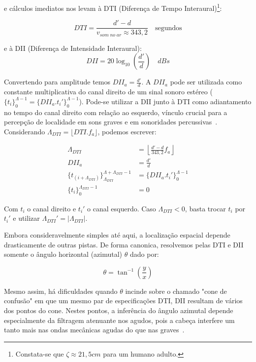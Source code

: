 e cálculos imediatos nos levam à DTI (Diferença de Tempo Interaural)\footnote{Constata-se que $\zeta \approx 21,5cm$ para um humano adulto.}:

\begin{equation}
DTI=\frac{d'-d}{v_{som\;no\;ar}\approx 343,2 }\quad \text{segundos}
\end{equation}

e à DII (Diferença de Intensidade Interaural):
\begin{equation}
DII=20\log_{10}\left (\frac{d'}{d}\right) \quad dBs
\end{equation}

Convertendo para amplitude temos $DII_a=\frac{d'}{d}$. A $DII_a$ pode
ser utilizada como constante multiplicativa do canal direito de um sinal sonoro estéreo ($\{t_i\}_0^{\Lambda -1}=\{DII_a . t_i'\}_0^{\Lambda -1}$). Pode-se utilizar a DII junto à DTI como adiantamento no tempo do canal direito com relação ao esquerdo, vínculo crucial para a percepção de localidade em sons graves e em sonoridades percussivas~\cite{Heeger}.
Considerando $\Lambda_{DTI}=\lfloor DTI . f_a \rfloor $, podemos escrever:

\begin{equation}
\begin{split}
\Lambda_{DTI} & = \left \lfloor \frac{d'-d}{343,2}  f_a \right \rfloor \\
DII_a & = \frac{d'}{d} \\
\{t_{(i+\Lambda_{DTI})}\}_{\Lambda_{DTI}}^{\Lambda+\Lambda_{DTI}-1} & =\{DII_a . t_i'\}_0^{\Lambda-1} \\
\{t_i\}_0^{\Lambda_{DTI}-1} & = 0
\end{split}
\end{equation}

Com $t_i$ o canal direito e $t_i'$ o canal esquerdo. Caso $\Lambda_{DTI} < 0 $, basta trocar $t_i$ por $t_i'$  e utilizar $\Lambda_{DTI}'= | \Lambda_{DTI} | $.

Embora consideravelmente simples até aqui, a localização espacial depende drasticamente de outras pistas. De forma canonica, resolvemos pelas
DTI e DII somente o ângulo horizontal (azimutal) $\theta$ dado por:

\begin{equation}
\theta=\tan^{-1}\left ( \frac{y}{ x }  \right )
\end{equation}

Mesmo assim, há dificuldades quando $\theta$ incinde sobre o chamado "cone de confusão" em que um mesmo par de especificações DTI, DII resultam de vários dos pontos 
do cone. Nestes pontos, a inferência do ângulo azimutal depende especialmente da filtragem atenuante nos agudos, pois a cabeça interfere um tanto mais nas ondas mecânicas agudas do que nas graves~\cite{Heeger,hrtf}. 

